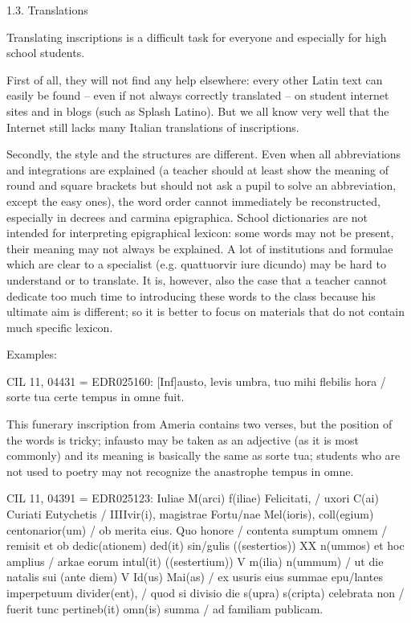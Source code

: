 \documentclass[amsthm,ebook]{saparticle}
\begin{document}
\bigskip


\bigskip


\bigskip

1.3. Translations

Translating inscriptions is a difficult task for everyone and especially for high school students.

First of all, they will not find any help elsewhere: every other Latin text can easily be found – even if not always
correctly translated – on student internet sites and in blogs (such as Splash Latino). But we all know very well that
the Internet still lacks many Italian translations of inscriptions.

Secondly, the style and the structures are different. Even when all abbreviations and integrations are explained (a
teacher should at least show the meaning of round and square brackets but should not ask a pupil to solve an
abbreviation, except the easy ones), the word order cannot immediately be reconstructed, especially in decrees and
carmina epigraphica. School dictionaries are not intended for interpreting epigraphical lexicon: some words may not be
present, their meaning may not always be explained. A lot of institutions and formulae which are clear to a specialist
(e.g. quattuorvir iure dicundo) may be hard to understand or to translate. It is, however, also the case that a teacher
cannot dedicate too much time to introducing these words to the class because his ultimate aim is different; so it is
better to focus on materials that do not contain much specific lexicon.

Examples:

\textwide{\FilledBigTriangleRight} CIL 11, 04431 = EDR025160: [Inf]austo, levis umbra, tuo mihi flebilis hora / sorte
tua certe tempus in omne fuit.

This funerary inscription from Ameria contains two verses, but the position of the words is tricky; infausto may be
taken as an adjective (as it is most commonly) and its meaning is basically the same as sorte tua; students who are not
used to poetry may not recognize the anastrophe tempus in omne.

\textwide{\FilledBigTriangleRight} CIL 11, 04391 = EDR025123: Iuliae M(arci) f(iliae) Felicitati, / uxori C(ai) Curiati
Eutychetis / IIIIvir(i), magistrae Fortu/nae Mel(ioris), coll(egium) centonarior(um) / ob merita eius. Quo honore /
contenta sumptum omnem / remisit et ob dedic(ationem) ded(it) sin/gulis ((sestertios)) XX n(ummos) et hoc amplius /
arkae eorum intul(it) ((sestertium)) V m(ilia) n(ummum) / ut die natalis sui (ante diem) V Id(us) Mai(as) / ex usuris
eius summae epu/lantes imperpetuum divider(ent), / quod si divisio die s(upra) s(cripta) celebrata non / fuerit tunc
pertineb(it) omn(is) summa / ad familiam publicam. 
\end{document}
